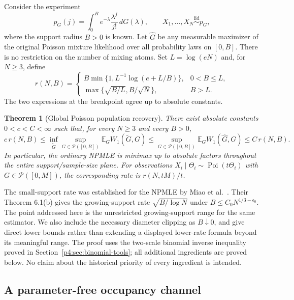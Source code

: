 \documentclass[11pt,a4paper]{article}
\newtheorem{theorem}{Theorem}[section]
\theoremstyle{definition}
\theoremstyle{remark}
\numberwithin{equation}{section}
\begin{document}
Consider the experiment
\[
 p_G(j)=\int_0^B e^{-\lambda}\frac{\lambda^j}{j!}\,dG(\lambda),
 \qquad X_1,\ldots,X_N\overset{\mathrm{iid}}\sim p_G,
\]
where the support radius $B>0$ is known.  Let $\widehat G$ be any
measurable maximizer of the original Poisson mixture likelihood over
all probability laws on $[0,B]$.  There is no restriction on the
number of mixing atoms.  Set $L=\log(eN)$ and, for $N\ge3$, define
\begin{equation}\label{p4:pg:rate}
 r(N,B)=
 \begin{cases}
 B\min\{1,L^{-1}\log(e+L/B)\},&0<B\le L,\\[2mm]
 \max\{\sqrt{B/L},B/\sqrt N\},&B>L.
 \end{cases}
\end{equation}
The two expressions at the breakpoint agree up to absolute constants.

\begin{theorem}[Global Poisson population recovery]\label{p4:pg:main}
There exist absolute constants $0<c<C<\infty$ such that, for every
$N\ge3$ and every $B>0$,
\[
 c\,r(N,B)\le
 \inf_{\widetilde G}\sup_{G\in\mathcal P([0,B])}
       \mathbb E_G W_1(\widetilde G,G)
 \le \sup_{G\in\mathcal P([0,B])}
       \mathbb E_G W_1(\widehat G,G)
 \le C\,r(N,B).
\]
In particular, the ordinary NPMLE is minimax up to absolute factors
throughout the entire support/sample-size plane.  For observations
$X_i\mid\Theta_i\sim\operatorname{Poi}(t\Theta_i)$ with
$G\in\mathcal P([0,M])$, the corresponding rate is $r(N,tM)/t$.
\end{theorem}

The small-support rate was established for the NPMLE by
Miao et al.\ \cite[Theorem 6.1(a)]{p8:PC_Miao2021}.  Their Theorem 6.1(b)
gives the growing-support rate $\sqrt{B/\log N}$ under
$B\le C_0N^{1/3-\epsilon_0}$.  The point addressed here is the
unrestricted growing-support range for the same estimator.  We also
include the necessary diameter clipping as $B\downarrow0$, and give
direct lower bounds rather than extending a displayed lower-rate
formula beyond its meaningful range.  The proof uses the two-scale
binomial inverse inequality proved in Section~\ref{p4:sec:binomial-tools};
all additional ingredients are proved below.  No claim about the
historical priority of every ingredient is intended.

\subsection{A parameter-free occupancy channel}
\end{document}
